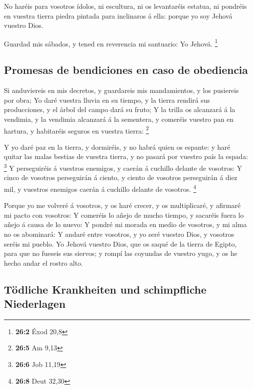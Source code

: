  No haréis para vosotros ídolos, ni escultura, ni os
levantaréis estatua, ni pondréis en vuestra tierra piedra pintada para
inclinaros á ella: porque yo soy Jehová vuestro Dios.

 Guardad mis sábados, y tened en reverencia mi santuario: Yo
Jehová. \footnote{\textbf{26:2} Éxod 20,8}

\hypertarget{promesas-de-bendiciones-en-caso-de-obediencia}{%
\subsection{Promesas de bendiciones en caso de
obediencia}\label{promesas-de-bendiciones-en-caso-de-obediencia}}

 Si anduviereis en mis decretos, y guardareis mis
mandamientos, y los pusiereis por obra;  Yo daré vuestra
lluvia en su tiempo, y la tierra rendirá sus producciones, y el árbol
del campo dará su fruto;  Y la trilla os alcanzará á la
vendimia, y la vendimia alcanzará á la sementera, y comeréis vuestro pan
en hartura, y habitaréis seguros en vuestra tierra: \footnote{\textbf{26:5}
  Am 9,13}

 Y yo daré paz en la tierra, y dormiréis, y no habrá quien
os espante: y haré quitar las malas bestias de vuestra tierra, y no
pasará por vuestro país la espada: \footnote{\textbf{26:6} Job 11,19}
 Y perseguiréis á vuestros enemigos, y caerán á cuchillo
delante de vosotros:  Y cinco de vosotros perseguirán á
ciento, y ciento de vosotros perseguirán á diez mil, y vuestros enemigos
caerán á cuchillo delante de vosotros. \footnote{\textbf{26:8} Deut
  32,30}

 Porque yo me volveré á vosotros, y os haré crecer, y os
multiplicaré, y afirmaré mi pacto con vosotros:  Y comeréis
lo añejo de mucho tiempo, y sacaréis fuera lo añejo á causa de lo nuevo:
 Y pondré mi morada en medio de vosotros, y mi alma no os
abominará:  Y andaré entre vosotros, y yo seré vuestro
Dios, y vosotros seréis mi pueblo.  Yo Jehová vuestro Dios,
que os saqué de la tierra de Egipto, para que no fueseis sus siervos; y
rompí las coyundas de vuestro yugo, y os he hecho andar el rostro alto.

\hypertarget{tuxf6dliche-krankheiten-und-schimpfliche-niederlagen}{%
\subsection{Tödliche Krankheiten und schimpfliche
Niederlagen}\label{tuxf6dliche-krankheiten-und-schimpfliche-niederlagen}}

